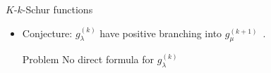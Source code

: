 \documentclass{beamer}
\begin{document}
\begin{frame}{\(K\)-\(k\)-Schur functions}
\begin{itemize}
\begin{align*}
\begin{ytableau}
        \textcolor{blue}{\bullet} &
        \textcolor{black}{\bullet} &
        *(lightgray) \textcolor{red}{\bullet} &
        \none[\textcolor{blue}{\bullet}]
      \end{ytableau}-
      \begin{ytableau}
        \none[\textcolor{red}{\bullet}] &
        \none[\textcolor{blue}{\bullet}] &
        \none[\textcolor{black}{\bullet}] &
        \none[\textcolor{red}{\bullet}] &
        \none[\textcolor{blue}{\bullet}] \\
        *(lightgray) \textcolor{blue}{\bullet} &
        \none[\textcolor{black}{\bullet}] &
        \none[\textcolor{red}{\bullet}] &
        \none[\textcolor{blue}{\bullet}] &
        \none[\textcolor{black}{\bullet}] \\
        \textcolor{black}{\bullet} &
        \none[\textcolor{red}{\bullet}] &
        \none[\textcolor{blue}{\bullet}] &
        \none[\textcolor{black}{\bullet}] &
        \none[\textcolor{red}{\bullet}] \\
        \textcolor{red}{\bullet} &
        \textcolor{blue}{\bullet} &
        \textcolor{black}{\bullet} &
        \none[\textcolor{red}{\bullet}] &
        \none[\textcolor{blue}{\bullet}]
      \end{ytableau}-
      \begin{ytableau}
        \none[\textcolor{red}{\bullet}] &
        \none[\textcolor{blue}{\bullet}] &
        \none[\textcolor{black}{\bullet}] &
        \none[\textcolor{red}{\bullet}] &
        \none[\textcolor{blue}{\bullet}] \\
        \textcolor{blue}{\bullet} &
        \none[\textcolor{black}{\bullet}] &
        \none[\textcolor{red}{\bullet}] &
        \none[\textcolor{blue}{\bullet}] &
        \none[\textcolor{black}{\bullet}] \\
        \textcolor{black}{\bullet} &
        \none[\textcolor{red}{\bullet}] &
        \none[\textcolor{blue}{\bullet}] &
        \none[\textcolor{black}{\bullet}] &
        \none[\textcolor{red}{\bullet}] \\
        \textcolor{red}{\bullet} &
        \textcolor{blue}{\bullet} &
        *(lightgray) \textcolor{black}{\bullet} &
        \none[\textcolor{red}{\bullet}] &
        \none[\textcolor{blue}{\bullet}]
      \end{ytableau}
    \end{align*}\pause
  \item Conjecture: \(g_\lambda^{(k)}\) have positive branching into
    \(g_\mu^{(k+1)}\)~\cite{lss,morse}.\pause
    \begin{block}{Problem}
      No direct formula for \(g_\lambda^{(k)}\)
    \end{block}
  \end{itemize}
\end{frame}
\end{document}
